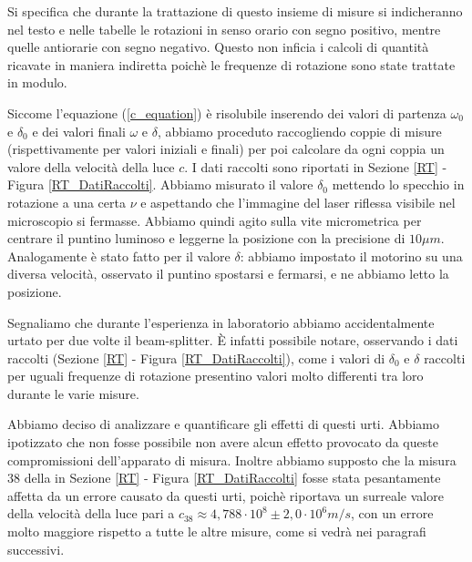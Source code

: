 \documentclass{article}
\begin{document}
\vspace{3mm}

Si specifica che durante la trattazione di questo insieme di misure si indicheranno nel testo e nelle tabelle le rotazioni in senso orario con segno positivo, mentre 
quelle antiorarie con segno negativo. Questo non inficia i calcoli di quantità ricavate in maniera indiretta poichè le frequenze di rotazione sono state trattate in
modulo.

\vspace{3mm}

Siccome l'equazione (\ref{c_equation}) è risolubile inserendo dei valori di partenza $\omega_0$ e $\delta_0$ e dei valori finali $\omega$ e $\delta$, abbiamo proceduto
raccogliendo coppie di misure (rispettivamente per valori iniziali e finali) per poi calcolare da ogni coppia un valore della velocità della luce $c$. I dati raccolti
sono riportati in Sezione \ref{RT} - Figura \ref{RT_DatiRaccolti}.
Abbiamo misurato il valore $\delta_0$ mettendo lo specchio in rotazione a una certa $\nu$ e aspettando che l'immagine del laser riflessa visibile nel microscopio
si fermasse. Abbiamo quindi agito sulla vite micrometrica per centrare il puntino luminoso e leggerne la posizione con la precisione di $10 \mu m$.
Analogamente è stato fatto per il valore $\delta$: abbiamo impostato il motorino su una diversa velocità, osservato il puntino spostarsi e fermarsi, e ne abbiamo letto la
posizione.

\vspace{3mm}

Segnaliamo che durante l'esperienza in laboratorio abbiamo accidentalmente urtato per due volte il beam-splitter. È infatti possibile notare, osservando i dati raccolti 
(Sezione \ref{RT} - Figura \ref{RT_DatiRaccolti}), come i valori di $\delta_0$ e $\delta$ raccolti per uguali frequenze di rotazione presentino valori molto differenti 
tra loro durante le varie misure.

\vspace{3mm}

Abbiamo deciso di analizzare e quantificare gli effetti di questi urti. Abbiamo ipotizzato che non fosse possibile non avere alcun effetto provocato da queste compromissioni
dell'apparato di misura. Inoltre abbiamo supposto che la misura 38 della in Sezione \ref{RT} - Figura \ref{RT_DatiRaccolti} fosse stata pesantamente affetta da un errore causato 
da questi urti, poichè riportava un surreale valore della velocità della luce pari a $c_{38}\approx 4,788 \cdot10^8 \pm 2,0 \cdot10^6 m/s$, con un errore molto maggiore 
rispetto a tutte le altre misure, come si vedrà nei paragrafi successivi. 
\end{document}
